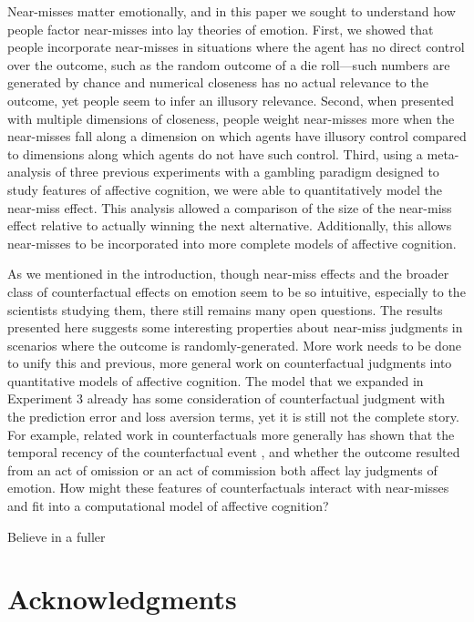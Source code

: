 \documentclass[10pt,letterpaper]{article}
\begin{document}
Near-misses matter emotionally, and in this paper we sought to understand how people factor near-misses into lay theories of emotion. First, we showed that people incorporate near-misses in situations where the agent has no direct control over the outcome, such as the random outcome of a die roll---such numbers are generated by chance and numerical closeness has no actual relevance to the outcome, yet people seem to infer an illusory relevance. Second, when presented with multiple dimensions of closeness, people weight near-misses more when the near-misses fall along a dimension on which agents have illusory control compared to dimensions along which agents do not have such control. Third, using a meta-analysis of three previous experiments with a gambling paradigm designed to study features of affective cognition, we were able to quantitatively model the near-miss effect. This analysis allowed a comparison of the size of the near-miss effect relative to actually winning the next alternative. Additionally, this allows near-misses to be incorporated into more complete models of affective cognition.


As we mentioned in the introduction, though near-miss effects and the broader class of counterfactual effects on emotion seem to be so intuitive, especially to the scientists studying them, there still remains many open questions. The results presented here suggests some interesting properties about near-miss judgments in scenarios where the outcome is randomly-generated. More work needs to be done to unify this and previous, more general work on counterfactual judgments into quantitative models of affective cognition. The model that we expanded in Experiment 3 already has some consideration of counterfactual judgment with the prediction error and loss aversion terms, yet it is still not the complete story. For example, related work in counterfactuals more generally has shown that the temporal recency of the counterfactual event \cite{Miller1990}, and whether the outcome resulted from an act of omission or an act of commission \cite{Kahneman1982, Landman1987} both affect lay judgments of emotion. How might these features of counterfactuals interact with near-misses and fit into a computational model of affective cognition?


Believe in a fuller 


\section{Acknowledgments}
\end{document}
